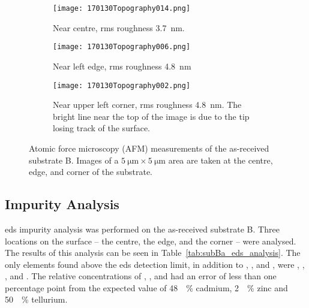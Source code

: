 \begin{figure}[htbp]
    \centering
    \begin{subfigure}[t]{\linewidth}
    \centering
        \texttt{[image: 170130Topography014.png]}
        \caption{Near centre, \ac{rms} roughness \SI{3,7}{\nano\metre}.}
    \end{subfigure}
    \par\bigskip
    \begin{subfigure}[t]{\linewidth}
    \centering
        \texttt{[image: 170130Topography006.png]}
        \caption{Near left edge, \ac{rms} roughness \SI{4,8}{\nano\metre}}
    \end{subfigure}
    \par\bigskip
    \begin{subfigure}[t]{\linewidth}
    \centering
        \texttt{[image: 170130Topography002.png]}
        \caption{Near upper left corner, \ac{rms} roughness \SI{4,8}{\nano\metre}. The bright line near the top of the image is due to the tip losing track of the surface.}
    \end{subfigure}
    \caption[AFM of as-received substrate B.]{Atomic force microscopy (AFM) measurements of the as-received substrate B. Images of a $\SI{5}{\micro\metre}\times\SI{5}{\micro\metre}$ area are taken at the centre, edge, and corner of the substrate.}\label{fig:afm_subB}
\end{figure} %


\subsection{Impurity Analysis}

\Ac{eds} impurity analysis was performed on the as-received substrate B. Three locations on the surface -- the centre, the edge, and the corner -- were analysed. The results of this analysis can be seen in Table~\ref{tab:subBa_eds_analysis}. The only elements found above the \ac{eds} detection limit, in addition to , , and , were , , , and . The relative concentrations of , , and  had an error of less than one percentage point from the expected value of \SI{48}{\atomic\percent} cadmium, \SI{2}{\atomic\percent} zinc and \SI{50}{\atomic\percent} tellurium.

